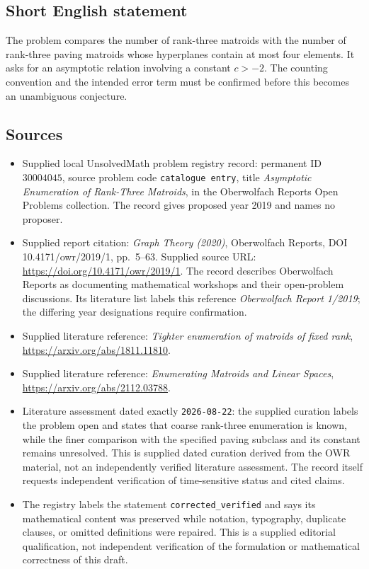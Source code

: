 \documentclass[11pt]{article}
\begin{document}
\subsection{Short English statement}
The problem compares the number of rank-three matroids with the number of rank-three paving matroids whose hyperplanes contain at most four elements. It asks for an asymptotic relation involving a constant \(c>-2\). The counting convention and the intended error term must be confirmed before this becomes an unambiguous conjecture.
\subsection{Sources}
\begin{itemize}
\item Supplied local UnsolvedMath problem registry record: permanent ID \(30004045\), source problem code \texttt{catalogue entry}, title \emph{Asymptotic Enumeration of Rank-Three Matroids}, in the Oberwolfach Reports Open Problems collection. The record gives proposed year 2019 and names no proposer.
\item Supplied report citation: \emph{Graph Theory (2020)}, Oberwolfach Reports, DOI 10.4171/owr/2019/1, pp.\ 5--63. Supplied source URL: \url{https://doi.org/10.4171/owr/2019/1}. The record describes Oberwolfach Reports as documenting mathematical workshops and their open-problem discussions. Its literature list labels this reference \emph{Oberwolfach Report 1/2019}; the differing year designations require confirmation.
\item Supplied literature reference: \emph{Tighter enumeration of matroids of fixed rank}, \url{https://arxiv.org/abs/1811.11810}.
\item Supplied literature reference: \emph{Enumerating Matroids and Linear Spaces}, \url{https://arxiv.org/abs/2112.03788}.
\item Literature assessment dated exactly \texttt{2026-08-22}: the supplied curation labels the problem open and states that coarse rank-three enumeration is known, while the finer comparison with the specified paving subclass and its constant remains unresolved. This is supplied dated curation derived from the OWR material, not an independently verified literature assessment. The record itself requests independent verification of time-sensitive status and cited claims.
\item The registry labels the statement \texttt{corrected\_verified} and says its mathematical content was preserved while notation, typography, duplicate clauses, or omitted definitions were repaired. This is a supplied editorial qualification, not independent verification of the formulation or mathematical correctness of this draft.
\end{itemize}
\end{document}
